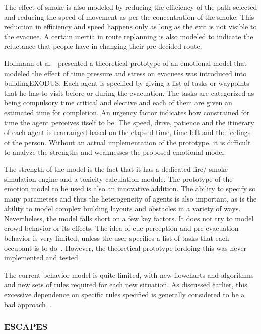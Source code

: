 The effect of smoke is also modeled by reducing the efficiency of the path selected and reducing the speed of movement as per the concentration of the smoke. This reduction in efficiency and speed happens only as long as the exit is not visible to the evacuee. A certain inertia in route replanning is also modeled to indicate the reluctance that people have in changing their pre-decided route.

Hollmann et al.~\cite{Hollmann:2010vy} presented a theoretical prototype of an emotional model that modeled the effect of time pressure and stress on evacuees was introduced into buildingEXODUS. Each agent is specified by giving a list of tasks or waypoints that he has to visit before or during the evacuation. The tasks are categorized as being compulsory time critical and elective and each of them are given an estimated time for completion. An urgency factor indicates how constrained for time the agent perceives itself to be. The speed, drive, patience and the itinerary of each agent is rearranged based on the elapsed time, time left and the feelings of the person. Without an actual implementation of the prototype, it is difficult to analyze the strengths and weaknesses the proposed emotional model.

The strength of the model is the fact that it has a dedicated fire/ smoke simulation engine and a toxicity calculation module. The prototype of the emotion model to be used is also an innovative addition. The ability to specify so many parameters and thus the heterogeneity of agents is also important, as is the ability to model complex building layouts and obstacles in a variety of ways. Nevertheless, the model falls short on a few key factors. It does not try to model crowd behavior or its effects. The idea of cue perception and pre-evacuation behavior is very limited, unless the user specifies a list of tasks that each occupant is to do~\cite{Owen:1996jh}. However, the theoretical prototype fordoing this was never implemented and tested.

The current behavior model is quite limited, with new flowcharts and algorithms and new sets of rules required for each new situation. As discussed earlier, this excessive dependence on specific rules specified is generally considered to be a bad approach~\cite{Still:2000tp}.

\subsubsection{ESCAPES}

